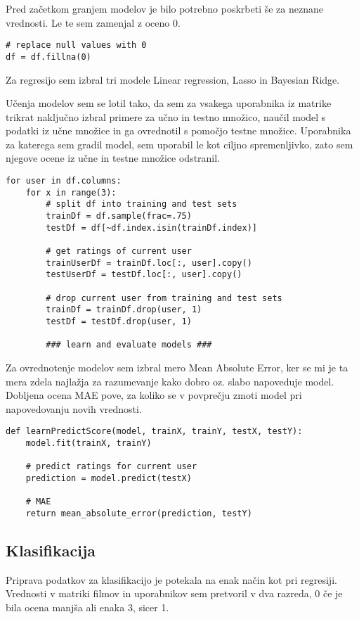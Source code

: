 \documentclass[a4paper,11pt]{article}
\begin{document}
Pred začetkom granjem modelov je bilo potrebno poskrbeti še za neznane vrednosti.
Le te sem zamenjal z oceno 0.

\begin{lstlisting}
# replace null values with 0
df = df.fillna(0)
\end{lstlisting}

Za regresijo sem izbral tri modele Linear regression, Lasso in Bayesian Ridge.

Učenja modelov sem se lotil tako, da sem za vsakega uporabnika iz matrike trikrat
naključno izbral primere za učno in testno množico, naučil model s podatki iz
učne množice in ga ovrednotil s pomočjo testne množice. Uporabnika za katerega
sem gradil model, sem uporabil le kot ciljno spremenljivko, zato sem njegove
ocene iz učne in testne množice odstranil.

\begin{lstlisting}
for user in df.columns:
    for x in range(3):
        # split df into training and test sets
        trainDf = df.sample(frac=.75)
        testDf = df[~df.index.isin(trainDf.index)]

        # get ratings of current user
        trainUserDf = trainDf.loc[:, user].copy()
        testUserDf = testDf.loc[:, user].copy()

        # drop current user from training and test sets
        trainDf = trainDf.drop(user, 1)
        testDf = testDf.drop(user, 1)

        ### learn and evaluate models ###
\end{lstlisting}

Za ovrednotenje modelov sem izbral mero Mean Absolute Error, ker se mi je ta
mera zdela najlažja za razumevanje kako dobro oz. slabo napoveduje model.
Dobljena ocena MAE pove, za koliko se v povprečju zmoti model pri napovedovanju
novih vrednosti.

\begin{lstlisting}
def learnPredictScore(model, trainX, trainY, testX, testY):
    model.fit(trainX, trainY)

    # predict ratings for current user
    prediction = model.predict(testX)

    # MAE
    return mean_absolute_error(prediction, testY)
\end{lstlisting}


\subsection{Klasifikacija}
Priprava podatkov za klasifikacijo je potekala na enak način kot pri regresiji. Vrednosti v matriki filmov in uporabnikov sem pretvoril v dva razreda, 0 če je bila ocena manjša ali enaka 3, sicer 1.
\end{document}

